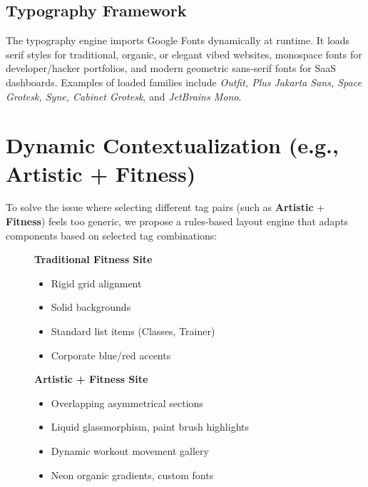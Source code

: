 \documentclass[11pt,a4paper]{article}
\begin{document}
\subsection{Typography Framework}
The typography engine imports Google Fonts dynamically at runtime. It loads serif styles for traditional, organic, or elegant vibed websites, monospace fonts for developer/hacker portfolios, and modern geometric sans-serif fonts for SaaS dashboards. Examples of loaded families include \textit{Outfit, Plus Jakarta Sans, Space Grotesk, Syne, Cabinet Grotesk}, and \textit{JetBrains Mono}.

\newpage

\section{Dynamic Contextualization (e.g., Artistic + Fitness)}
To solve the issue where selecting different tag pairs (such as \textbf{Artistic} + \textbf{Fitness}) feels too generic, we propose a rules-based layout engine that adapts components based on selected tag combinations:

\begin{figure}[h]
\centering
\begin{minipage}{0.48\textwidth}
\centering
\textbf{Traditional Fitness Site}
\begin{itemize}
    \item Rigid grid alignment
    \item Solid backgrounds
    \item Standard list items (Classes, Trainer)
    \item Corporate blue/red accents
\end{itemize}
\end{minipage}
\hfill
\begin{minipage}{0.48\textwidth}
\centering
\textbf{Artistic + Fitness Site}
\begin{itemize}
    \item Overlapping asymmetrical sections
    \item Liquid glassmorphism, paint brush highlights
    \item Dynamic workout movement gallery
    \item Neon organic gradients, custom fonts
\end{itemize}
\end{minipage}
\end{figure}
\end{document}
